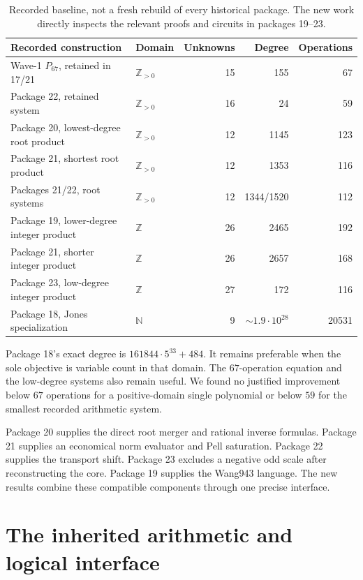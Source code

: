 \documentclass[11pt]{article}
\theoremstyle{remark}\newtheorem{remark}[theorem]{Remark}
\newcommand{\Z}{\mathbb Z}
\newcommand{\N}{\mathbb N}
\begin{document}
\begin{table}[ht]
\centering\small
\begin{tabular}{p{4.65cm}lrrr}
\toprule
Recorded construction & Domain & Unknowns & Degree & Operations\\
\midrule
Wave-1 \(P_{67}\), retained in 17/21 & \(\Z_{>0}\) & 15 & 155 & 67\\
Package 22, retained system & \(\Z_{>0}\) & 16 & 24 & 59\\
Package 20, lowest-degree root product & \(\Z_{>0}\) & 12 & 1145 & 123\\
Package 21, shortest root product & \(\Z_{>0}\) & 12 & 1353 & 116\\
Packages 21/22, root systems & \(\Z_{>0}\) & 12 & 1344/1520 & 112\\
Package 19, lower-degree integer product & \(\Z\) & 26 & 2465 & 192\\
Package 21, shorter integer product & \(\Z\) & 26 & 2657 & 168\\
Package 23, low-degree integer product & \(\Z\) & 27 & 172 & 116\\
Package 18, Jones specialization & \(\N\) & 9 & \(\sim1.9\cdot10^{28}\) & 20531\\
\bottomrule
\end{tabular}
\caption{Recorded baseline, not a fresh rebuild of every historical
package. The new work directly inspects the relevant proofs and
circuits in packages 19--23.}
\end{table}

Package 18's exact degree is \(161844\cdot5^{33}+484\).
It remains preferable when the sole objective is variable count in
that domain. The \(67\)-operation equation and the low-degree systems
also remain useful. We found no justified improvement below \(67\)
operations for a positive-domain single polynomial or below \(59\)
for the smallest recorded arithmetic system.

Package 20 supplies the direct root merger and rational inverse
formulas. Package 21 supplies an economical norm evaluator and Pell
saturation. Package 22 supplies the transport shift. Package 23
excludes a negative odd scale after reconstructing the core.
Package 19 supplies the Wang943 language. The new results combine
these compatible components through one precise interface.

\section{The inherited arithmetic and logical interface}
\label{sec:interface}
\end{document}
